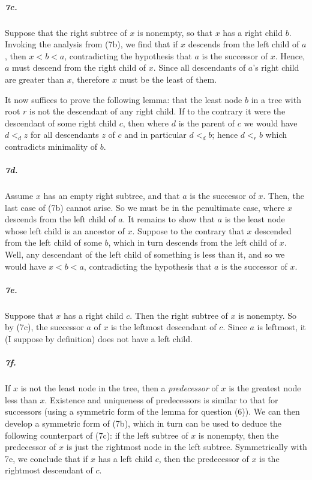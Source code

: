 \documentclass[
]{article}
\begin{document}
\subparagraph{7c.} Suppose that the right subtree of $x$ is nonempty, so that $x$ has a right child $b$.  Invoking the analysis from (7b), we find that if $x$ descends from the left child of $a$, then $x<b<a$, contradicting the hypothesis that $a$ is the successor of $x$.  Hence, $a$ must descend from the right child of $x$.  Since all descendants of $a$'s right child are greater than $x$, therefore $x$ must be the least of them.


It now suffices to prove the following lemma: that the least node $b$ in a tree with root $r$ is not the descendant of any right child.  If to the contrary it were the descendant of some right child $c$, then where $d$ is the parent of $c$ we would have $d <_d z$ for all descendants $z$ of $c$ and in particular $d<_d b$; hence $d<_rb$ which contradicts minimality of $b$.

\subparagraph{7d.} Assume $x$ has an empty right subtree, and that $a$ is the successor of $x$.  Then, the last case of (7b) cannot arise.  So we must be in the penultimate case, where $x$ descends from the left child of $a$.  It remains to show that $a$ is the least node whose left child is an ancestor of $x$.  Suppose to the contrary that $x$ descended from the left child of some $b$, which in turn descends from the left child of $x$.  Well, any descendant of the left child of something is less than it, and so we would have $x<b<a$, contradicting the hypothesis that $a$ is the successor of $x$.


\subparagraph{7e.} Suppose that $x$ has a right child $c$. Then the right subtree of $x$ is nonempty.  So by (7c), the successor $a$ of $x$ is the leftmost descendant of $c$.  Since $a$ is leftmost, it (I suppose by definition) does not have a left child.

\subparagraph{7f.} If $x$ is not the least node in the tree, then a \emph{predecessor} of $x$ is the greatest node less than $x$.  Existence and uniqueness of predecessors is similar to that for successors (using a symmetric form of the lemma for question (6)).  We can then develop a symmetric form of (7b), which in turn can be used to deduce the following counterpart of (7c):  if the left subtree of $x$ is nonempty, then the predecessor of $x$ is just the rightmost node in the left subtree.  Symmetrically with 7e, we conclude that if $x$ has a left child $c$, then the predecessor of $x$ is the rightmost descendant of $c$.
\end{document}
